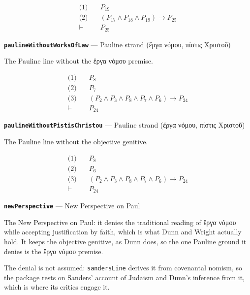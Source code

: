 \documentclass[11pt]{article}
\begin{document}
\begin{align*}
  \text{(1)} \quad & P_{19} \\
  \text{(2)} \quad & (P_{17} \land P_{18} \land P_{19}) \rightarrow P_{25} \\
  \vdash \quad & P_{25}
\end{align*}
\par\medskip\noindent\textbf{\texttt{pauline\allowbreak{}Without\allowbreak{}Works\allowbreak{}Of\allowbreak{}Law}} --- Pauline strand (ἔργα νόμου, πίστις Χριστοῦ)\par\nobreak\noindent
The Pauline line without the ἔργα νόμου premise.

\begin{align*}
  \text{(1)} \quad & P_{8} \\
  \text{(2)} \quad & P_{7} \\
  \text{(3)} \quad & (P_{2} \land P_{3} \land P_{8} \land P_{7} \land P_{6}) \rightarrow P_{24} \\
  \vdash \quad & P_{24}
\end{align*}
\par\medskip\noindent\textbf{\texttt{pauline\allowbreak{}Without\allowbreak{}Pistis\allowbreak{}Christou}} --- Pauline strand (ἔργα νόμου, πίστις Χριστοῦ)\par\nobreak\noindent
The Pauline line without the objective genitive.

\begin{align*}
  \text{(1)} \quad & P_{8} \\
  \text{(2)} \quad & P_{6} \\
  \text{(3)} \quad & (P_{2} \land P_{3} \land P_{8} \land P_{7} \land P_{6}) \rightarrow P_{24} \\
  \vdash \quad & P_{24}
\end{align*}
\par\medskip\noindent\textbf{\texttt{new\allowbreak{}Perspective}} --- New Perspective on Paul\par\nobreak\noindent
The New Perspective on Paul: it denies the traditional reading of ἔργα νόμου while accepting justification by faith, which is what Dunn and Wright actually hold. It keeps the objective genitive, as Dunn does, so the one Pauline ground it denies is the ἔργα νόμου premise.

The denial is not assumed: \texttt{sanders\allowbreak{}Line} derives it from covenantal nomism, so the package rests on Sanders' account of Judaism and Dunn's inference from it, which is where its critics engage it.
\end{document}
